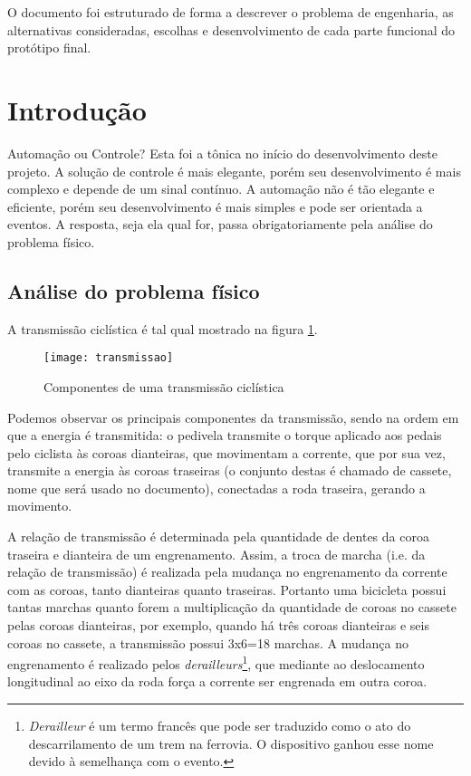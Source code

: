 \documentclass[a4paper,11pt]{article}
\begin{document}
O documento foi estruturado de forma a descrever o problema de engenharia, as
alternativas consideradas, escolhas e desenvolvimento de cada parte funcional do
protótipo final.


\pagebreak
%
\section{Introdução}
\label{sec:intro}
Automação ou Controle? Esta foi a tônica no início do desenvolvimento
deste projeto. A solução de controle é mais elegante, porém seu desenvolvimento
é mais complexo e depende de um sinal contínuo. A automação não é tão elegante e
eficiente, porém seu desenvolvimento é mais simples e pode ser orientada a
eventos. A resposta, seja ela qual for, passa obrigatoriamente pela análise do
problema físico.

\subsection{Análise do problema físico}
A transmissão ciclística é tal qual mostrado na figura \ref{fig:transmissao}.
\begin{figure}[ht]
\begin{center}
 \texttt{[image: transmissao]}
\end{center}
  \caption{Componentes de uma transmissão ciclística}
  \label{fig:transmissao}
\end{figure}
Podemos observar os principais componentes da transmissão, sendo na ordem em que
a energia é transmitida: o pedivela transmite o torque aplicado aos pedais pelo
ciclista às coroas dianteiras, que movimentam a corrente, que por sua vez,
transmite a energia às coroas traseiras (o conjunto destas é chamado de cassete,
nome que será usado no documento), conectadas a roda traseira, gerando a
movimento.

A relação de transmissão é determinada pela quantidade de dentes da coroa
traseira e dianteira de um engrenamento. Assim, a troca de marcha
(i.e. da relação de transmissão) é realizada pela mudança no engrenamento da
corrente com as coroas, tanto dianteiras  quanto traseiras. Portanto uma
bicicleta possui tantas marchas quanto forem a multiplicação da quantidade de
coroas no cassete pelas coroas dianteiras, por exemplo, quando há três coroas
dianteiras e seis coroas no cassete, a transmissão possui 3x6=18 marchas.
A mudança no engrenamento é realizado pelos
\textit{derailleurs}\footnote{\textit{Derailleur} é um termo francês que pode
ser traduzido como o ato do descarrilamento de um trem na ferrovia. O
dispositivo ganhou esse nome devido à semelhança com o evento.}, que mediante ao
deslocamento longitudinal ao eixo da roda força a corrente ser engrenada em
outra coroa.
\end{document}
